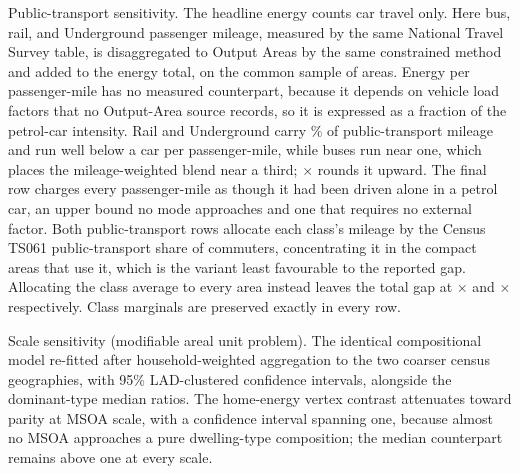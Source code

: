 \documentclass[pdflatex,sn-nature]{sn-jnl}
\begin{document}
\begin{table}[p]
\caption{Public-transport sensitivity. The headline energy counts car travel only. Here bus, rail, and Underground passenger mileage, measured by the same National Travel Survey table, is disaggregated to Output Areas by the same constrained method and added to the energy total, on the common sample of \nepiptSampleN{} areas. Energy per passenger-mile has no measured counterpart, because it depends on vehicle load factors that no Output-Area source records, so it is expressed as a fraction of the petrol-car intensity. Rail and Underground carry \nepiptRailShare\% of public-transport mileage and run well below a car per passenger-mile, while buses run near one, which places the mileage-weighted blend near a third; \nepiptIntensityAssumed$\times$ rounds it upward. The final row charges every passenger-mile as though it had been driven alone in a petrol car, an upper bound no mode approaches and one that requires no external factor. Both public-transport rows allocate each class's mileage by the Census TS061 public-transport share of commuters, concentrating it in the compact areas that use it, which is the variant least favourable to the reported gap. Allocating the class average to every area instead leaves the total gap at \nepiptClassAssumedTotal$\times$ and \nepiptClassCeilingTotal$\times$ respectively. Class marginals are preserved exactly in every row.}
\label{edtab:publictransport}

\end{table}

\begin{table}[p]
\caption{Scale sensitivity (modifiable areal unit problem). The identical compositional model re-fitted after household-weighted aggregation to the two coarser census geographies, with 95\% LAD-clustered confidence intervals, alongside the dominant-type median ratios. The home-energy vertex contrast attenuates toward parity at MSOA scale, with a confidence interval spanning one, because almost no MSOA approaches a pure dwelling-type composition; the median counterpart remains above one at every scale.}
\label{edtab:maup}
\setlength{\tabcolsep}{3pt}

\end{table}
\end{document}
